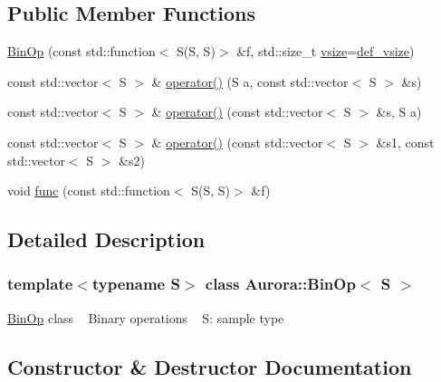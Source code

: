 \subsection*{Public Member Functions}
\begin{DoxyCompactItemize}
\item 
\hyperlink{class_aurora_1_1_bin_op_aa8b5c6b77e89f4c73847716a695be047}{Bin\+Op} (const std\+::function$<$ S(S, S)$>$ \&f, std\+::size\+\_\+t \hyperlink{class_aurora_1_1_snd_base_af9e21aaf411b17f7a8221c991ce5d291}{vsize}=\hyperlink{namespace_aurora_afaaddf667a06e7ce23c667a8b7295263}{def\+\_\+vsize})
\item 
const std\+::vector$<$ S $>$ \& \hyperlink{class_aurora_1_1_bin_op_aef7a0a9a5daa40c22e540f08ca928fab}{operator()} (S a, const std\+::vector$<$ S $>$ \&s)
\item 
const std\+::vector$<$ S $>$ \& \hyperlink{class_aurora_1_1_bin_op_a488095df0eb9f16da6643476dec9e51c}{operator()} (const std\+::vector$<$ S $>$ \&s, S a)
\item 
const std\+::vector$<$ S $>$ \& \hyperlink{class_aurora_1_1_bin_op_abe8a0b7666caeda012d9ac18f889e116}{operator()} (const std\+::vector$<$ S $>$ \&s1, const std\+::vector$<$ S $>$ \&s2)
\item 
void \hyperlink{class_aurora_1_1_bin_op_aa440ae97cd1e9f0e1aaa077a57850f3d}{func} (const std\+::function$<$ S(S, S)$>$ \&f)
\end{DoxyCompactItemize}


\subsection{Detailed Description}
\subsubsection*{template$<$typename S$>$\newline
class Aurora\+::\+Bin\+Op$<$ S $>$}

\hyperlink{class_aurora_1_1_bin_op}{Bin\+Op} class ~\newline
Binary operations ~\newline
S\+: sample type 

\subsection{Constructor \& Destructor Documentation}
\mbox{\label{class_aurora_1_1_bin_op_aa8b5c6b77e89f4c73847716a695be047}} 
